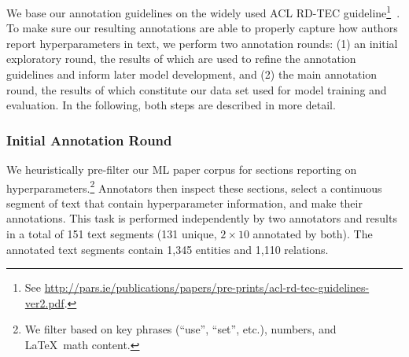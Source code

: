 We base our annotation guidelines on the widely used ACL RD-TEC guideline\footnote{See \url{http://pars.ie/publications/papers/pre-prints/acl-rd-tec-guidelines-ver2.pdf}.}~\cite{Qasemizadeh2016}. To make sure our resulting annotations are able to properly capture how authors report hyperparameters in text, we perform two annotation rounds: (1) an initial exploratory round, the results of which are used to refine the annotation guidelines and inform later model development, and (2) the main annotation round, the results of which constitute our data set used for model training and evaluation. In the following, both steps are described in more detail.

\subsubsection{Initial Annotation Round}\label{sec:exploreannot}


We heuristically pre-filter our ML paper corpus for sections reporting on hyperparameters.\footnote{We filter based on key phrases (``use'', ``set'', etc.), numbers, and \LaTeX\ math content.} Annotators then inspect these sections, select a continuous segment of text that contain hyperparameter information, and make their annotations. This task is performed independently by two annotators and results in a total of 151 text segments (131 unique, $2\times10$ annotated by both). The annotated text segments contain 1,345 entities and 1,110 relations.

